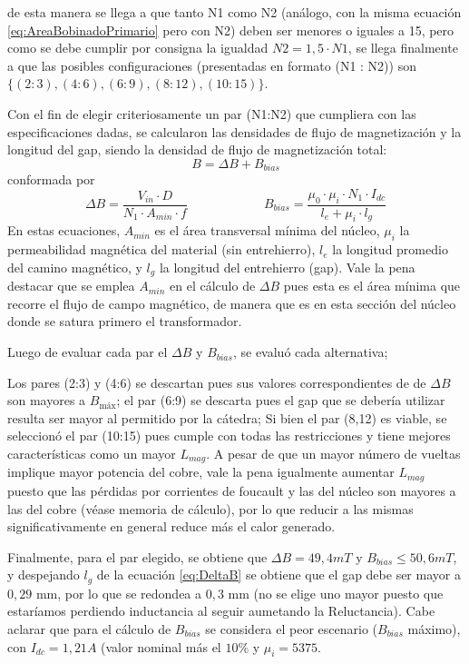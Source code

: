 \documentclass{article}
\begin{document}
de esta manera se llega a que tanto N1 como N2 (análogo, con la misma ecuación \ref{eq:AreaBobinadoPrimario} pero con N2) deben ser menores o iguales a 15, pero como se debe cumplir por consigna la igualdad $ N2 = 1,5 \cdot N1 $, se llega finalmente a que las posibles configuraciones 
(presentadas en formato (N1 : N2)) son $ \{ (2:3), (4:6), (6:9), (8:12), (10:15) \} $. \par



Con el fin de elegir criteriosamente un par (N1:N2) que cumpliera con las especificaciones dadas, se calcularon las densidades de flujo de magnetización y la longitud del gap, siendo la densidad de flujo de magnetización total:
\begin{equation}
    B = \Delta B + B_{bias}
\end{equation}
conformada por
\begin{equation}
    \Delta B = \frac{V_{in} \cdot D}{N_1 \cdot A_{min} \cdot f} \qquad \qquad \qquad 
    B_{bias} = \frac{\mu_0 \cdot \mu_i \cdot N_1 \cdot I_{dc}}{l_e + \mu_i \cdot l_g}
    \label{eq:DeltaB}
\end{equation}
En estas ecuaciones, $ A_{min} $ es el área transversal mínima del núcleo, $\mu_i$ la permeabilidad magnética del material (sin entrehierro), $l_e$ la longitud promedio del camino magnético, y $l_g$ la longitud del entrehierro (gap).
Vale la pena destacar que se emplea $ A_{min} $ en el cálculo de $ \Delta B $ pues esta es el área mínima que recorre el flujo de campo magnético, de manera que es en esta sección del núcleo donde se satura primero el transformador.

Luego de evaluar cada par el $ \Delta B $ y $ B_{bias} $, se evaluó cada alternativa;


Los pares (2:3) y (4:6) se descartan pues sus valores correspondientes de de $\Delta B$ son mayores a $B_{\text{máx}}$; 
el par (6:9) se descarta pues el gap que se debería utilizar resulta ser mayor al permitido por la cátedra; 
Si bien el par (8,12) es viable, se seleccionó el par (10:15) pues cumple con todas las restricciones y tiene
mejores características como un mayor $L_{mag}$. A pesar de que un mayor número de vueltas implique mayor potencia del 
cobre, vale la pena igualmente aumentar $L_{mag}$ puesto que las pérdidas por corrientes de foucault y las del 
núcleo son mayores a las del cobre (véase memoria de cálculo), por lo que reducir a las mismas significativamente en general reduce más 
el calor generado.

Finalmente, para el par elegido, se obtiene que $ \Delta B = 49,4 mT $ y $ B_{bias} \le 50,6 mT $, y despejando $l_g$ de la ecuación \ref{eq:DeltaB} se obtiene que el gap debe ser mayor a $ 0,29$ mm, por lo que se redondea a $ 0,3$ mm (no se elige uno mayor puesto que estaríamos perdiendo inductancia al seguir aumetando la Reluctancia).
Cabe aclarar que para el cálculo de $ B_{bias}$ se considera el peor escenario ($B_{bias}$ máximo), con $I_{dc} = 1,21 A$ (valor nominal más el $ 10\% $ y $\mu_{i} = 5375$.
\end{document}
